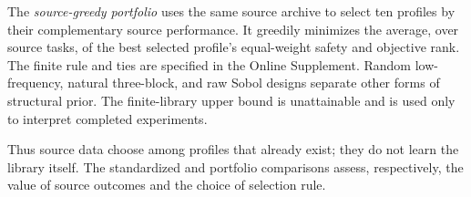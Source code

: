 The \emph{source-greedy portfolio} uses the same source archive to select ten
profiles by their complementary source performance.  It greedily minimizes
the average, over source tasks, of the best selected profile's equal-weight
safety and objective rank.  The finite rule and ties are specified in the
Online Supplement.  Random low-frequency, natural three-block, and raw Sobol
designs separate other forms of structural prior.  The finite-library upper
bound is unattainable and is used only to interpret completed experiments.

Thus source data choose among profiles that already exist; they do not learn
the library itself.  The standardized and portfolio comparisons assess,
respectively, the value of source outcomes and the choice of selection rule.
